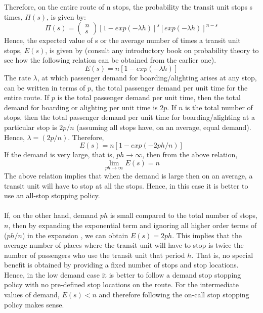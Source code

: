 Therefore, on the entire route of n stops, the probability the transit unit stops s times, $\Pi(s)$, is given by:
\begin{equation}
	\Pi(s) = \begin{pmatrix}
		n\\
		s
	\end{pmatrix} [1 - exp(- \lambda h)]^s [exp(- \lambda h)]^{n - s}
\end{equation}
Hence, the expected value of s or the average number of times a transit unit stops, $E(s)$, is given by (consult any introductory book on probability theory to see how the following relation can be obtained from the earlier one).
\begin{equation}
	E(s) = n[1 - exp(- \lambda h)]
\end{equation}
The rate $\lambda$, at which passenger demand for boarding/alighting arises at any stop, can be written in terms of $p$, the total passenger demand per unit time for the entire route. If $p$ is the total passenger demand per unit time, then the total demand for boarding or alighting per unit time is $ 2p $. If $n$ is the total number of stops, then the total passenger demand per unit time for boarding/alighting at a particular stop is $2p/n$ (assuming all stops have, on an average, equal demand). Hence, $\lambda = (2p/n)$. Therefore,
\begin{equation}
	E(s) = n[1 - exp(- 2ph/n)]
\end{equation}
If the demand is very large, that is, $ph \rightarrow \infty$, then from the above relation,
\begin{equation}
	\lim_{ph \to \infty} E(s) = n
\end{equation}
The above relation implies that when the demand is large then on an average, a transit unit will have to stop at all the stops. Hence, in this case it is better to use an all-stop stopping policy.\\\\
If, on the other hand, demand $ph$ is small compared to the total number of stops, $ n $, then by expanding the exponential term and ignoring all higher order terms of ($ph/n$) in the expansion , we can obtain $E(s) = 2ph$. This implies that the average number of places where the transit unit will have to stop is twice the number of passengers who use the transit unit that period $h$. That is, no special benefit is obtained by providing a fixed number of stops and stop locations. Hence, in the low demand case it is better to follow a demand stop stopping policy with no pre-defined stop locations on the route. For the intermediate values of demand, $ E(s) < n$ and therefore following the on-call stop stopping policy  makes sense.\\\\
